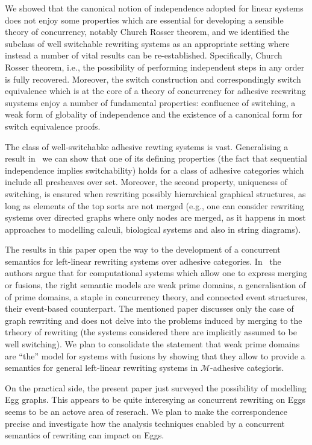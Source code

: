 \documentclass[a4paper,UKenglish,cleveref,pdftex,thm-restate,numberwithinsect,anonymous]{lipics}
\begin{document}
We showed that the canonical notion of independence adopted for linear
systems does not enjoy some properties which are essential for
developing a sensible theory of concurrency, notably Church Rosser
theorem, and we identified the subclass of well switchable rewriting
systems as an appropriate setting where instead a number of vital
results can be re-established. Specifically, Church Rosser theorem,
i.e., the possibility of performing independent steps in any order is
fully recovered. Moreover, the switch construction and correspondingly
switch equivalence which is at the core of a theory of concurrency for
adhesive recwritng suystems enjoy a number of fundamental properties:
confluence of switching, a weak form of globality of independence and
the existence of a canonical form for switch equivalence proofs.

The class of well-switchabke adhesive rewting systems is vast. Generalising a result in~\cite{baldan2011adhesivity} we can show that one of its defining properties (the fact that sequential independence implies switchability) holds for a class of adhesive categories which include all presheaves over set. Moreover, the second property, uniqueness of switching, is ensured when rewriting possibly hierarchical graphical structures, as long as elements of the top sorts are not merged (e.g., one can consider rewriting systems over directed graphs where only nodes are merged, as it happens in most approaches to modelling calculi, biological systems and also in string diagrams).

The results in this paper open the way to the development of a
concurrent semantics for left-linear rewriting systems over adhesive
categories. In~\cite{baldan2017domains} the authors argue that for
computational systems which allow one to express merging or fusions,
the right semantic models are weak prime domains, a generalisation of
of prime domains, a staple in concurrency theory, and connected event
structures, their event-based counterpart. The mentioned paper
discusses only the case of graph rewriting and does not delve into the
problems induced by merging to the trheory of rewriting (the systems
considered there are implicitly assumed to be well switching). We plan to consolidate the statement that weak prime domains are ``the'' model for systems with fusions by showing that they allow to provide a semantics for general left-linear rewriting systems in $\mathcal{M}$-adhesive categioris.

On the practical side, the present paper just surveyed the possibility
of modelling Egg graphs. This appears to be quite interesying as
concurrent rewriting on Eggs seems to be an actove area of
reserach.  We plan to make the correspondence precise
and investigate how the analysis techniques enabled by a concurrent
semantics of rewriting can impact on Eggs.
\end{document}
